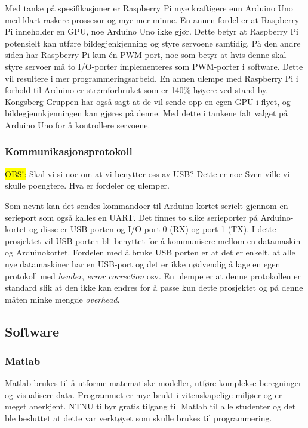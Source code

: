 Med tanke på spesifikasjoner er Raspberry Pi mye kraftigere enn Arduino Uno med klart raskere prossesor og mye mer minne. En annen fordel er at Raspberry Pi inneholder en GPU, noe Arduino Uno ikke gjør. Dette betyr at Raspberry Pi potensielt kan utføre bildegjenkjenning og styre servoene samtidig. På den andre siden har Raspberry Pi kun én PWM-port, noe som betyr at hvis denne skal styre servoer må to I/O-porter implementeres som PWM-porter i software. Dette vil resultere i mer programmeringsarbeid. En annen ulempe med Raspberry Pi i forhold til Arduino er strømforbruket som er 140\% høyere ved stand-by. Kongsberg Gruppen har også sagt at de vil sende opp en egen GPU i flyet, og bildegjennkjenningen kan gjøres på denne. Med dette i tankene falt valget på Arduino Uno for å kontrollere servoene.

\subsubsection{Kommunikasjonsprotokoll}
\colorbox{yellow}{OBS!:} Skal vi si noe om at vi benytter oss av USB? Dette er noe Sven ville vi skulle poengtere. Hva er fordeler og ulemper.

Som nevnt kan det sendes kommandoer til Arduino kortet serielt gjennom en serieport som også kalles en UART. Det finnes to slike serieporter på Arduino-kortet og disse er USB-porten og I/O-port 0 (RX) og port 1 (TX). I dette prosjektet vil USB-porten bli benyttet for å kommunisere mellom en datamaskin og Arduinokortet. Fordelen med å bruke USB porten er at det er enkelt, at alle nye datamaskiner har en USB-port og det er ikke nødvendig å lage en egen protokoll med \emph{header}, \emph{error correction} osv. En ulempe er at denne protokollen er standard slik at den ikke kan endres for å passe kun dette prosjektet og på denne måten minke mengde \emph{overhead}.

\subsection{Software}

\subsubsection{Matlab}
Matlab brukes til å utforme matematiske modeller, utføre komplekse beregninger og visualisere data. Programmet er mye brukt i vitenskapelige miljøer og er meget anerkjent. NTNU tilbyr gratis tilgang til Matlab til alle studenter og det ble besluttet at dette var verktøyet som skulle brukes til programmering. \cite{matlab}

